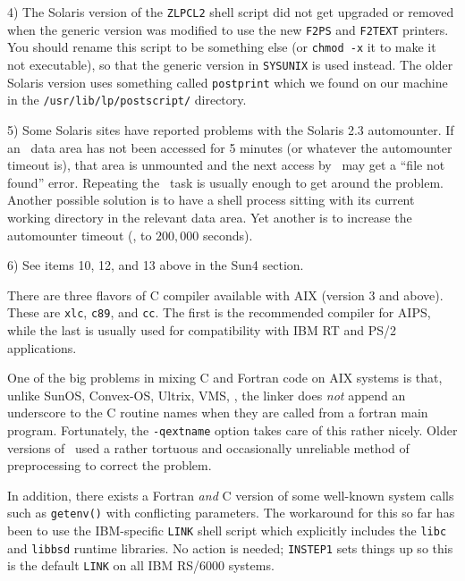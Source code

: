{{\item{4)} The Solaris version of the {\tt ZLPCL2} shell script did not get
upgraded or removed when the generic version was modified to use the new
{\tt F2PS} and {\tt F2TEXT} printers.  You should rename this script to be
something else (or {\tt chmod -x} it to make it not executable), so that
the generic version in {\tt\dol SYSUNIX} is used instead.  The older
Solaris version uses something called {\tt postprint} which we found on
our machine in the {\tt /usr/lib/lp/postscript/} directory.

\item{5)} Some Solaris sites have reported problems with the Solaris 2.3
automounter.  If an \AIPS\ data area has not been accessed for 5 minutes
(or whatever the automounter timeout is), that area is unmounted and the
next access by \AIPS\ may get a ``file not found'' error.  Repeating the
\AIPS\ task is usually enough to get around the problem.  Another possible
solution is to have a shell process sitting with its current working
directory in the relevant data area.  Yet another is to increase the
automounter timeout (\eg, to $200,000$ seconds).

\item{6)} See items 10, 12, and 13 above in the Sun4 section.

\medskip


There are three flavors of C compiler available with AIX (version 3 and
above).  These are {\tt xlc}, {\tt c89}, and {\tt cc}.  The first is the
recommended compiler for AIPS, while the last is usually used for
compatibility with IBM RT and PS/2 applications.

One of the big problems in mixing C and Fortran code on AIX systems is
that, unlike SunOS, Convex-OS, Ultrix, VMS, \etc, the linker does {\it
not\/} append an underscore to the C routine names when they are called
from a fortran main program.  Fortunately, the {\tt -qextname} option
takes care of this rather nicely.  Older versions of \AIPS\ used a
rather tortuous and occasionally unreliable method of preprocessing to
correct the problem.

In addition, there exists a Fortran {\it and\/} C version of some
well-known system calls such as {\tt getenv()} with conflicting
parameters.  The workaround for this so far has been to use the
IBM-specific {\tt LINK} shell script which explicitly includes the
{\tt libc} and {\tt libbsd} runtime libraries.  No action is needed;
{\tt INSTEP1} sets things up so this is the default {\tt LINK} on all
IBM RS/6000 systems.

}}
